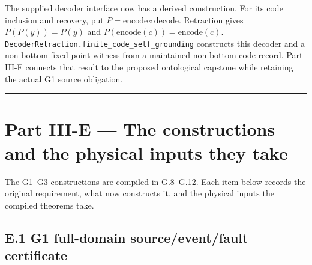 \documentclass[
]{article}
\begin{document}
The supplied decoder interface now has a derived construction. For its
code inclusion and recovery, put
\(P=\mathrm{encode}\circ\mathrm{decode}\). Retraction gives
\(P(P(y))=P(y)\) and \(P(\mathrm{encode}(c))=\mathrm{encode}(c)\).
\texttt{D\allowbreak{}e\allowbreak{}c\allowbreak{}o\allowbreak{}d\allowbreak{}e\allowbreak{}r\allowbreak{}R\allowbreak{}e\allowbreak{}t\allowbreak{}r\allowbreak{}a\allowbreak{}c\allowbreak{}t\allowbreak{}i\allowbreak{}o\allowbreak{}n\allowbreak{}.\allowbreak{}f\allowbreak{}i\allowbreak{}n\allowbreak{}i\allowbreak{}t\allowbreak{}e\allowbreak{}\_\allowbreak{}c\allowbreak{}o\allowbreak{}d\allowbreak{}e\allowbreak{}\_\allowbreak{}s\allowbreak{}e\allowbreak{}l\allowbreak{}f\allowbreak{}\_\allowbreak{}g\allowbreak{}r\allowbreak{}o\allowbreak{}u\allowbreak{}n\allowbreak{}d\allowbreak{}i\allowbreak{}n\allowbreak{}g}
constructs this decoder and a non-bottom fixed-point witness from a
maintained non-bottom code record. Part III-F connects that result to
the proposed ontological capstone while retaining the actual G1 source
obligation.

\begin{center}\rule{0.5\linewidth}{0.5pt}\end{center}

\section{Part III-E --- The constructions and the physical inputs they
take}\label{part-iii-e-the-constructions-and-the-physical-inputs-they-take}

The G1--G3 constructions are compiled in G.8--G.12. Each item below
records the original requirement, what now constructs it, and the
physical inputs the compiled theorems take.

\subsection{\texorpdfstring{E.1 G1 full-domain
s\allowbreak{}o\allowbreak{}u\allowbreak{}r\allowbreak{}c\allowbreak{}e\allowbreak{}/\allowbreak{}e\allowbreak{}v\allowbreak{}e\allowbreak{}n\allowbreak{}t\allowbreak{}/\allowbreak{}f\allowbreak{}a\allowbreak{}u\allowbreak{}l\allowbreak{}t
certificate}{E.1 G1 full-domain  certificate}}\label{e.1-g1-full-domain-sourceeventfault-certificate}
\end{document}
